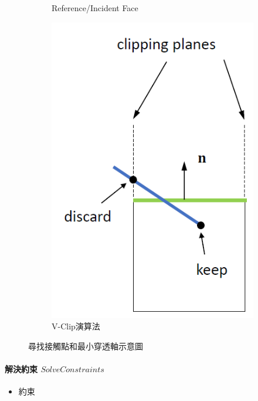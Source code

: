 \begin{figure}[h]
\begin{subfigure}[b]{0.24\linewidth}
    \caption{Reference/Incident Face}
    \end{subfigure}
    \begin{subfigure}[b]{0.24\linewidth}
    \includegraphics[width=0.8\linewidth]{./resources/physics/vclip.png}
    \caption{V-Clip演算法}
    \end{subfigure}
\caption{尋找接觸點和最小穿透軸示意圖}
\label{fig:phy_AABB}
\end{figure}


\newpage

\paragraph{解決約束 \(Solve Constraints\)}

\begin{itemize}
    \item{約束}
\end{itemize}

